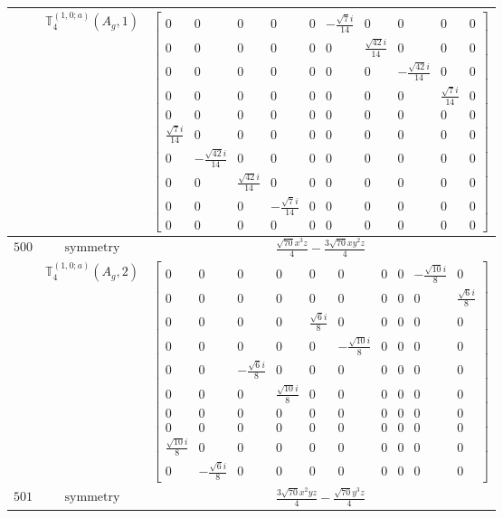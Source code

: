 \documentclass[fleqn,8pt,landscape]{jsarticle}
\begin{document}
\begin{longtable}{ccc}
$  $ & $ \mathbb{T}_{4}^{(1,0;a)}(A_{g},1) $ & $ \begin{bmatrix} 0 & 0 & 0 & 0 & 0 & - \frac{\sqrt{7} i}{14} & 0 & 0 & 0 & 0 \\ 0 & 0 & 0 & 0 & 0 & 0 & \frac{\sqrt{42} i}{14} & 0 & 0 & 0 \\ 0 & 0 & 0 & 0 & 0 & 0 & 0 & - \frac{\sqrt{42} i}{14} & 0 & 0 \\ 0 & 0 & 0 & 0 & 0 & 0 & 0 & 0 & \frac{\sqrt{7} i}{14} & 0 \\ 0 & 0 & 0 & 0 & 0 & 0 & 0 & 0 & 0 & 0 \\ \frac{\sqrt{7} i}{14} & 0 & 0 & 0 & 0 & 0 & 0 & 0 & 0 & 0 \\ 0 & - \frac{\sqrt{42} i}{14} & 0 & 0 & 0 & 0 & 0 & 0 & 0 & 0 \\ 0 & 0 & \frac{\sqrt{42} i}{14} & 0 & 0 & 0 & 0 & 0 & 0 & 0 \\ 0 & 0 & 0 & - \frac{\sqrt{7} i}{14} & 0 & 0 & 0 & 0 & 0 & 0 \\ 0 & 0 & 0 & 0 & 0 & 0 & 0 & 0 & 0 & 0 \end{bmatrix} $ \\ \hline
$ 500 $ & $ \text{symmetry} $ & $ \frac{\sqrt{70} x^{3} z}{4} - \frac{3 \sqrt{70} x y^{2} z}{4} $ \\
$  $ & $ \mathbb{T}_{4}^{(1,0;a)}(A_{g},2) $ & $ \begin{bmatrix} 0 & 0 & 0 & 0 & 0 & 0 & 0 & 0 & - \frac{\sqrt{10} i}{8} & 0 \\ 0 & 0 & 0 & 0 & 0 & 0 & 0 & 0 & 0 & \frac{\sqrt{6} i}{8} \\ 0 & 0 & 0 & 0 & \frac{\sqrt{6} i}{8} & 0 & 0 & 0 & 0 & 0 \\ 0 & 0 & 0 & 0 & 0 & - \frac{\sqrt{10} i}{8} & 0 & 0 & 0 & 0 \\ 0 & 0 & - \frac{\sqrt{6} i}{8} & 0 & 0 & 0 & 0 & 0 & 0 & 0 \\ 0 & 0 & 0 & \frac{\sqrt{10} i}{8} & 0 & 0 & 0 & 0 & 0 & 0 \\ 0 & 0 & 0 & 0 & 0 & 0 & 0 & 0 & 0 & 0 \\ 0 & 0 & 0 & 0 & 0 & 0 & 0 & 0 & 0 & 0 \\ \frac{\sqrt{10} i}{8} & 0 & 0 & 0 & 0 & 0 & 0 & 0 & 0 & 0 \\ 0 & - \frac{\sqrt{6} i}{8} & 0 & 0 & 0 & 0 & 0 & 0 & 0 & 0 \end{bmatrix} $ \\ \hline
$ 501 $ & $ \text{symmetry} $ & $ \frac{3 \sqrt{70} x^{2} y z}{4} - \frac{\sqrt{70} y^{3} z}{4} $ \\

\end{longtable}
\end{document}
